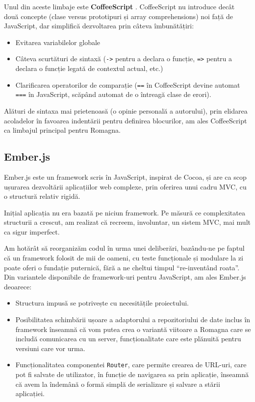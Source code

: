 \documentclass[12pt, a4paper, twoside, romanian]{teza-upb}
\begin{document}
      Unul din aceste limbaje este \textbf{CoffeeScript} \cite{ashkenas:2012:coffescript}. CoffeeScript nu introduce decât două concepte (clase versus prototipuri și array comprehensions) noi față de JavaScript, dar simplifică dezvoltarea prin câteva îmbunătățiri:
      \begin{itemize}
        \item Evitarea variabilelor globale
        \item Câteva scurtături de sintaxă (\verb=->= pentru a declara o funcție, \verb~=>~ pentru a declara o funcție legată de contextul actual, etc.) 
        \item Clarificarea operatorilor de comparație (\verb~==~ în CoffeeScript devine automat \verb~===~ în JavaScript, scăpând automat de o întreagă clase de erori).
      \end{itemize}
          Alături de sintaxa mai prietenoasă (o opinie personală a autorului), prin elidarea acoladelor în favoarea indentării pentru definirea blocurilor, am ales CoffeeScript ca limbajul principal pentru Romagna.

    \subsection{Ember.js}
      Ember.js este un framework scris în JavaScript, inspirat de Cocoa, și are ca scop ușurarea dezvoltării aplicațiilor web complexe, prin oferirea unui cadru MVC, cu o structură relativ rigidă. 
      
      Inițial aplicația nu era bazată pe niciun framework. Pe măsură ce complexitatea structurii a crescut, am realizat că recreem, involuntar, un sistem MVC, mai mult ca sigur imperfect.
     
      Am hotărât să reorganizăm codul în urma unei deliberări, bazându-ne pe faptul că un framework folosit de mii de oameni, cu teste funcționale și modulare la zi poate oferi o fundație puternică, fără a ne cheltui timpul ``re-inventând roata''. Din variantele disponibile de framework-uri pentru JavaScript, am ales Ember.js deoarece:
      \begin{itemize}
        \item Structura impusă se potrivește cu necesitățile proiectului.
        \item Posibilitatea schimbării ușoare a adaptorului a repozitoriului de date inclus în framework înseamnă că vom putea crea o variantă viitoare a Romagna care se includă comunicarea cu un server, funcționalitate care este plănuită pentru versiuni care vor urma.
        \item Funcționalitatea componentei \verb=Router=, care permite crearea de URL-uri, care pot fi salvate de utilizator, în funcție de navigarea sa prin aplicație, înseamnă că avem la îndemână o formă simplă de serializare și salvare a stării aplicației.
      \end{itemize}
\end{document}
